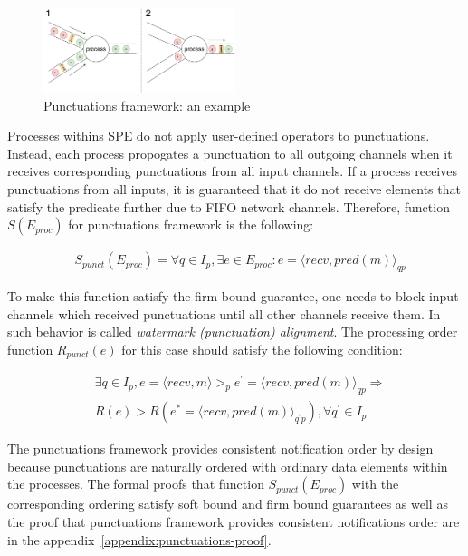 \begin{figure}[htbp]
  \centering
  \includegraphics[width=0.50\textwidth]{pics/punctuations-scheme.pdf}
  \caption{Punctuations framework: an example}
  \label{punctuations_scheme}
\end{figure}

Processes withins SPE do not apply user-defined operators to punctuations. Instead, each process propogates a punctuation to all outgoing channels when it receives corresponding punctuations from all input channels. If a process receives punctuations from all inputs, it is guaranteed that it do not receive elements that satisfy the predicate further due to FIFO network channels. Therefore, function $S(E_{proc})$ for punctuations framework is the following:

\begin{align*}
& S_{punct}(E_{proc}) = \forall q \in I_p, \exists e \in E_{proc} : e = \langle recv,pred(m)\rangle_{qp}
\end{align*}

To make this function satisfy the firm bound guarantee, one needs to block input channels which received punctuations until all other channels receive them. In~\cite{Carbone:2017:SMA:3137765.3137777} such behavior is called {\em watermark (punctuation) alignment}. The processing order function $R_{punct}(e)$ for this case should satisfy the following condition:

\begin{align*}
& \exists q \in I_p, e = \langle recv,m \rangle >_p e^{'} = \langle recv,pred(m)\rangle_{qp} \Longrightarrow \\ 
& R(e) > R(e^{*}= \langle recv,pred(m) \rangle_{q^{'}p}), \forall q^{'} \in I_p
\end{align*}

The punctuations framework provides consistent notification order by design because punctuations are naturally ordered with ordinary data elements within the processes. The formal proofs that function $S_{punct}(E_{proc})$ with the corresponding ordering satisfy soft bound and firm bound guarantees as well as the proof that punctuations framework provides consistent notifications order are in the appendix~\ref{appendix:punctuations-proof}.

